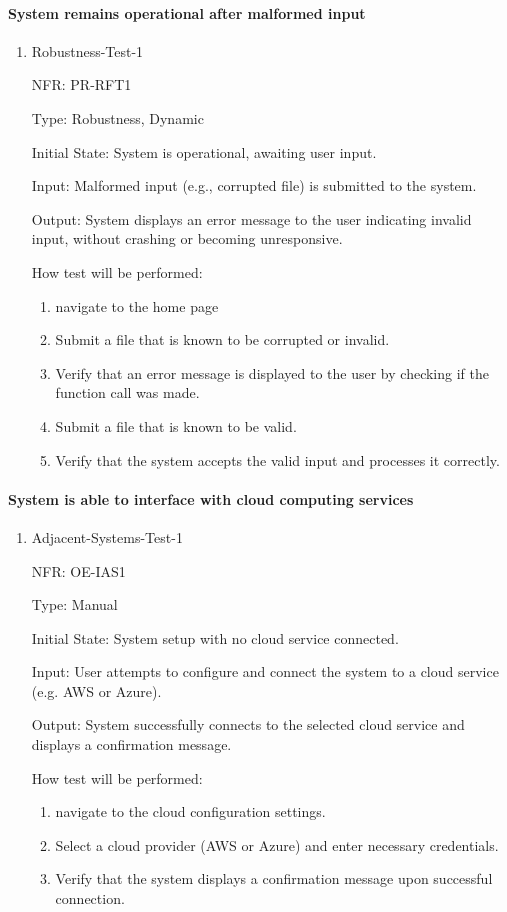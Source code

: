 \documentclass[12pt, titlepage]{article}
\begin{document}
\paragraph{System remains operational after malformed input}
\begin{enumerate}
  \item{Robustness-Test-1}

  NFR: PR-RFT1

  Type: Robustness, Dynamic
            
  Initial State: System is operational, awaiting user input.
            
  Input:  Malformed input (e.g., corrupted file) is submitted to the system.
            
  Output: System displays an error message to the user indicating invalid input, without crashing or becoming unresponsive.
            
  How test will be performed: 
  \begin{enumerate}
    \item navigate to the home page
    \item Submit a file that is known to be corrupted or invalid.
    \item Verify that an error message is displayed to the user by checking if the function call was made.
    \item Submit a file that is known to be valid.
    \item Verify that the system accepts the valid input and processes it correctly.
  \end{enumerate}
\end{enumerate}

\paragraph{System is able to interface with cloud computing services}
\begin{enumerate}
  \item{Adjacent-Systems-Test-1}

  NFR: OE-IAS1

  Type: Manual
            
  Initial State: System setup with no cloud service connected.
            
  Input:  User attempts to configure and connect the system to a cloud service (e.g. AWS or Azure).
            
  Output: System successfully connects to the selected cloud service and displays a confirmation message.
            
  How test will be performed: 
  \begin{enumerate}
    \item navigate to the cloud configuration settings.
    \item Select a cloud provider (AWS or Azure) and enter necessary credentials.
    \item Verify that the system displays a confirmation message upon successful connection.
  \end{enumerate}
\end{enumerate}
\end{document}
